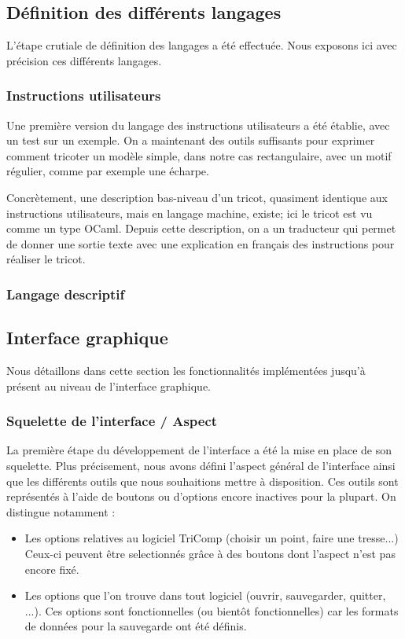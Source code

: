 \documentclass{article}
\begin{document}
\subsection{Définition des différents langages}

L'étape crutiale de définition des langages a été effectuée. Nous exposons ici avec précision ces différents langages.

\subsubsection{Instructions utilisateurs}

Une première version du langage des instructions utilisateurs a été établie, avec un test sur un exemple. On a maintenant des outils suffisants pour exprimer comment tricoter un modèle simple, dans notre cas rectangulaire, avec un motif régulier, comme par exemple une écharpe. 

Concrètement, une description bas-niveau d'un tricot, quasiment identique aux instructions utilisateurs, mais en langage machine, existe; ici le tricot est vu comme un type OCaml. Depuis cette description, on a un traducteur qui permet de donner une sortie texte avec une explication en français des instructions pour réaliser le tricot.

\subsubsection{Langage descriptif}

\subsection{Interface graphique}

Nous détaillons dans cette section les fonctionnalités implémentées jusqu'à présent au niveau de l'interface graphique.

\subsubsection{Squelette de l'interface / Aspect}

La première étape du développement de l'interface a été la mise en place de son squelette. Plus précisement, nous avons défini l'aspect 
général de l'interface ainsi que les différents outils que nous souhaitions mettre à disposition. Ces outils sont représentés à l'aide de 
boutons ou d'options encore inactives pour la plupart. On distingue notamment :
\begin{itemize}
  \item Les options relatives au logiciel TriComp (choisir un point, faire une tresse...) Ceux-ci peuvent être selectionnés grâce à des 
boutons dont l'aspect n'est pas encore fixé. %
  \item Les options que l'on trouve dans tout logiciel (ouvrir, sauvegarder, quitter, ...). Ces options sont fonctionnelles (ou bientôt 
fonctionnelles) car les formats de données pour la sauvegarde ont été définis.
\end{itemize}
\end{document}
